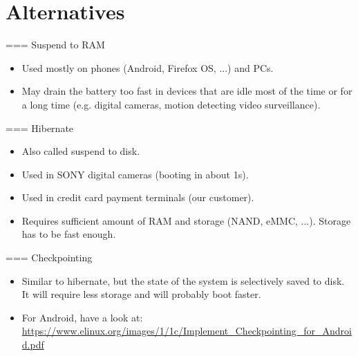 \section{Alternatives}
=== Suspend to RAM
\begin{itemize}
\item Used mostly on phones (Android, Firefox OS, ...) and PCs.
\item May drain the battery too fast in devices that are idle most of the time or
      for a long time (e.g. digital cameras, motion detecting video surveillance).
\end{itemize}


=== Hibernate
\begin{itemize}
\item Also called suspend to disk.
\item Used in SONY digital cameras (booting in about 1s).
\item Used in credit card payment terminals (our customer).
\item Requires sufficient amount of RAM and storage (NAND, eMMC, ...).
      Storage has to be fast enough.
\end{itemize}


=== Checkpointing
\begin{itemize}
\item Similar to hibernate, but the state of the system is selectively saved
      to disk. It will require less storage and will probably boot faster.
\item For Android, have a look at:
      \url{https://www.elinux.org/images/1/1c/Implement_Checkpointing_for_Android.pdf}
\end{itemize}



